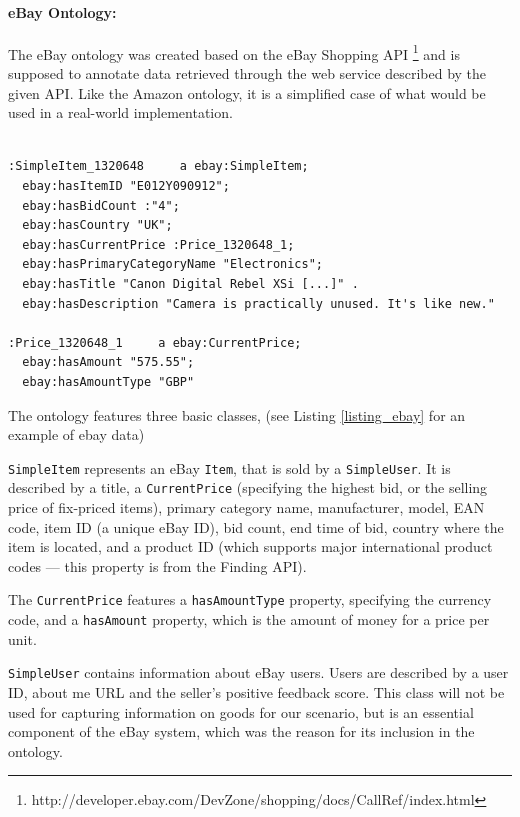 \paragraph{eBay Ontology:}
The eBay ontology was created based on the eBay Shopping API \footnote{http://developer.ebay.com/DevZone/shopping/docs/CallRef/index.html} and is supposed to annotate data retrieved through the web service described by the given API. Like the Amazon ontology, it is a simplified case of what would be used in a real-world implementation.

\begin{center}
\lstset{captionpos=b, breaklines=true}
\lstset{frame=single, basicstyle=\small}
\lstset{caption=Simplified eBay ontology data in N3 notation, label=listing_ebay}
\lstset{language=XML}
\begin{lstlisting}

:SimpleItem_1320648     a ebay:SimpleItem;
  ebay:hasItemID "E012Y090912";
  ebay:hasBidCount :"4";
  ebay:hasCountry "UK";
  ebay:hasCurrentPrice :Price_1320648_1;
  ebay:hasPrimaryCategoryName "Electronics";
  ebay:hasTitle "Canon Digital Rebel XSi [...]" .
  ebay:hasDescription "Camera is practically unused. It's like new."

:Price_1320648_1     a ebay:CurrentPrice;
  ebay:hasAmount "575.55";
  ebay:hasAmountType "GBP" 
\end{lstlisting}
\end{center}

The ontology features three basic classes, (see Listing \ref{listing_ebay} for an example of ebay data)
\begin{inparaenum}[(1)]
    \item \texttt{SimpleItem} represents an eBay \texttt{Item}, that is sold by a \texttt{SimpleUser}. It is described by a title, a \texttt{CurrentPrice} (specifying the highest bid, or the selling price of fix-priced items), primary category name, manufacturer, model, EAN code, item ID (a unique eBay ID), bid count, end time of bid, country where the item is located, and a product ID (which supports major international product codes --- this property is from the Finding API).
    \item The \texttt{CurrentPrice} features a \texttt{hasAmountType} property, specifying the currency code, and a \texttt{hasAmount} property, which is the amount of money for a price per unit.
    \item \texttt{SimpleUser} contains information about eBay users. Users are described by a user ID, about me URL and the seller's positive feedback score. This class will not be used for capturing information on goods for our scenario, but is an essential component of the eBay system, which was the reason for its inclusion in the ontology.
\end{inparaenum}

